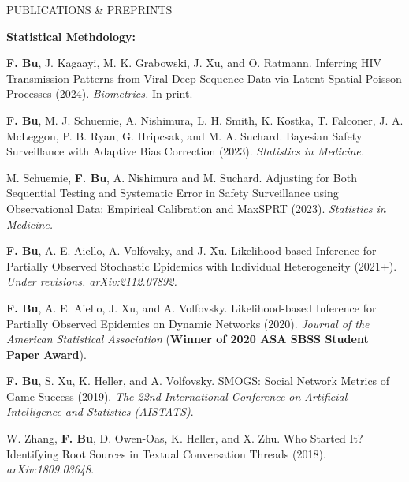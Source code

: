 \documentclass{resume} %
\begin{document}


\begin{rSection}{PUBLICATIONS \& PREPRINTS}

\hspace{-.2in} \textbf{Statistical Methdology:}

\textbf{F. Bu}, J. Kagaayi, M. K. Grabowski, J. Xu, and O. Ratmann.
Inferring HIV Transmission Patterns from Viral Deep-Sequence Data via Latent Spatial Poisson Processes (2024). \emph{Biometrics.} In print. %

\smallskip

\textbf{F. Bu}, M. J. Schuemie,  A. Nishimura, L. H. Smith, K. Kostka, T. Falconer, J. A. McLeggon, P. B. Ryan, G. Hripcsak, and M. A. Suchard.
Bayesian Safety Surveillance with Adaptive Bias Correction (2023). \emph{Statistics in Medicine.} %

\smallskip



M. Schuemie, \textbf{F. Bu}, A. Nishimura and M. Suchard.
Adjusting for Both Sequential Testing and Systematic Error in Safety Surveillance using Observational Data: Empirical Calibration and MaxSPRT (2023). \emph{Statistics in Medicine.}

\smallskip


\textbf{F. Bu}, A. E. Aiello, A. Volfovsky, and J. Xu.  
Likelihood-based Inference for Partially Observed Stochastic Epidemics with Individual Heterogeneity (2021+). \emph{Under revisions.  arXiv:2112.07892.}%

\smallskip


\textbf{F. Bu}, A. E. Aiello, J. Xu, and A. Volfovsky. 
Likelihood-based Inference for Partially Observed Epidemics on Dynamic Networks (2020). \emph{Journal of the American Statistical Association} (\textbf{Winner of 2020 ASA SBSS Student Paper Award}). %

\smallskip

\textbf{F. Bu}, S. Xu, K. Heller, and A. Volfovsky. 
SMOGS: Social Network Metrics of Game Success (2019). \emph{The 22nd International Conference on Artificial Intelligence and Statistics (AISTATS)}. %

\smallskip

W. Zhang, \textbf{F. Bu}, D. Owen-Oas, K. Heller, and X. Zhu. 
Who Started It? Identifying Root Sources in Textual Conversation Threads (2018). \emph{arXiv:1809.03648}.


\end{rSection}
\end{document}
